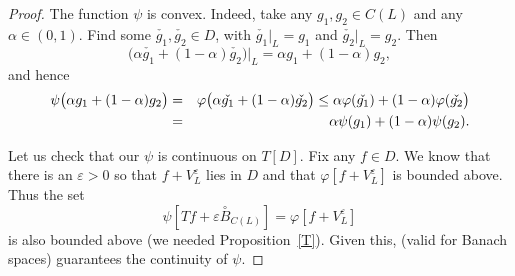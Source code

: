 \documentclass[12pt]{amsart}
\theoremstyle{plain}
\theoremstyle{definition}
\theoremstyle{remark}
\def\ee{\varepsilon}
\def\vv{\varphi}
\def\ee{\varepsilon}
\def\ee{\varepsilon}
\begin{document}
\begin{proof}
The function $\psi$ is convex. Indeed, take any $g_1,g_2\in {C(L)}$ and any $\alpha\in (0,1)$.
Find some $\check{g_1}, \check{g_2}\in D$, with $\check{g_1}|_L=g_1$ and $\check{g_2}|_L=g_2$.
Then %
$$\big(\alpha \check{g_1} +(1-\alpha)\check{g_2}\big)|_L= \alpha g_1+(1-\alpha)g_2,$$ and
hence
\begin{eqnarray*}
\psi\big(\alpha g_1+(1-\alpha)g_2\big) &=& \vv \big(\alpha \check{g_1} +(1-\alpha)\check{g_2}\big) \le \alpha \vv(\check{g_1}) + (1-\alpha) \vv(\check{g_2}\big)\cr
&=&\alpha \psi({g_1}) + (1-\alpha) \psi({g_2}).
\end{eqnarray*}

Let us check that our $\psi$ is continuous on $T[D]$. Fix any $f\in D$. We know that there is an $\ee>0$ so that $f+V^\ee_L$ lies in $D$ and that
$\vv[f+ V^\ee_L]$ is bounded above.
Thus the set $$\psi[Tf+\ee\!\!\stackrel \circ B_{C(L)}] = \vv[f+V^\ee_L]$$ is also bounded above (we needed Proposition~\ref{T}). Given this, \cite[p. 4, 5]{p} (valid for Banach spaces) guarantees the continuity of $\psi$.


\end{proof}
\end{document}
